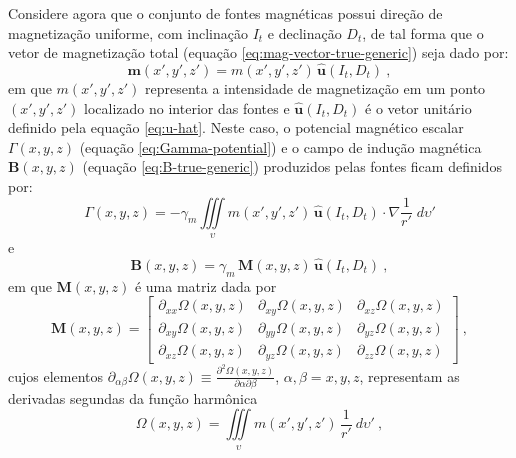 Considere agora que o conjunto de fontes magnéticas possui direção de magnetização 
uniforme, com inclinação $I_{t}$ e declinação $D_{t}$, de tal forma que o vetor 
de magnetização total (equação \ref{eq:mag-vector-true-generic}) seja dado por:
\begin{equation}
\mathbf{m}(x', y', z') = m(x', y', z') \, \hat{\mathbf{u}}(I_{t}, D_{t}) \: ,
\label{eq:mag-vector-true-uniform}
\end{equation}
em que $m(x', y', z')$ representa a intensidade de magnetização em um ponto $(x', y', z')$ 
localizado no interior das fontes e $\hat{\mathbf{u}}(I_{t}, D_{t})$ é o vetor unitário 
definido pela equação \ref{eq:u-hat}.
Neste caso, o potencial magnético escalar $\Gamma(x, y, z)$ (equação \ref{eq:Gamma-potential}) 
e o campo de indução magnética $\mathbf{B}(x, y, z)$ (equação \ref{eq:B-true-generic}) produzidos 
pelas fontes ficam definidos por:
\begin{equation}
\Gamma(x, y, z) = - \gamma_{m} \iiint\limits_{\upsilon} 
m(x', y', z') \, \hat{\mathbf{u}}(I_{t}, D_{t}) \cdot \nabla\frac{1}{r'} 
\; d\upsilon'
\label{eq:Gamma-potential-mag-uniform}
\end{equation}
e
\begin{equation}
\mathbf{B}(x, y, z) = \gamma_{m} \, \mathbf{M}(x, y, z) \, \hat{\mathbf{u}}(I_{t}, D_{t}) \: ,
\label{eq:B-true-mag-uniform}
\end{equation}
em que $\mathbf{M}(x, y, z)$ é uma matriz dada por
\begin{equation}
	\mathbf{M}(x, y, z) = \begin{bmatrix}
		\partial_{xx} \Omega(x, y, z) & 
		\partial_{xy} \Omega(x, y, z) &
		\partial_{xz} \Omega(x, y, z) \\
		\partial_{xy} \Omega(x, y, z) & 
		\partial_{yy} \Omega(x, y, z) &
		\partial_{yz} \Omega(x, y, z) \\
		\partial_{xz} \Omega(x, y, z) & 
		\partial_{yz} \Omega(x, y, z) &
		\partial_{zz} \Omega(x, y, z)
	\end{bmatrix} \: ,
	\label{eq:M-matrix}
\end{equation}
cujos elementos $\partial_{\alpha\beta} \Omega(x, y, z) \equiv 
\frac{\partial^{2} \Omega(x, y, z)}{\partial \alpha \partial \beta}$, 
$\alpha, \beta = x, y, z$, representam as derivadas segundas da função harmônica 
\begin{equation}
\Omega(x, y, z) = \iiint\limits_{\upsilon} 
m(x', y', z') \, \frac{1}{r'} \: d\upsilon' \: ,
\label{eq:Omega-potential}
\end{equation}
